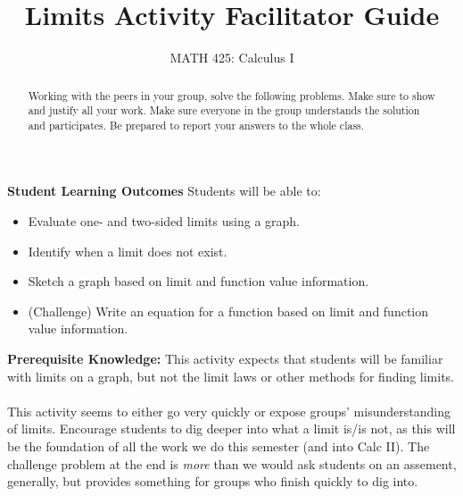 \documentclass{ximera}
\title{Limits Activity Facilitator Guide}
\author{MATH 425: Calculus I}
\begin{document}
\begin{abstract}
    Working with the peers in your group, solve the following problems. Make sure to show and justify all your work. Make sure everyone in the group understands the solution and participates. Be prepared to report your answers to the whole class. 
\end{abstract}
\maketitle

\textbf{Student Learning Outcomes}
Students will be able to:
  \begin{itemize}   
    \item Evaluate one- and two-sided limits using a graph.
    \item Identify when a limit does not exist. 
    \item Sketch a graph based on limit and function value information.
    \item (Challenge) Write an equation for a function based on limit and function value information.
  \end{itemize}

\textbf{Prerequisite Knowledge:} This activity expects that students will be familiar with limits on a graph, but not the limit laws or other methods for finding limits.  \\
\\

This activity seems to either go very quickly or expose groups' misunderstanding of limits. Encourage students to dig deeper into what a limit is/is not, as this will be the foundation of all the work we do this semester (and into Calc II).  The challenge problem at the end is \textit{more} than we would ask students on an assement, generally, but provides something for groups who finish quickly to dig into.
\end{document}
